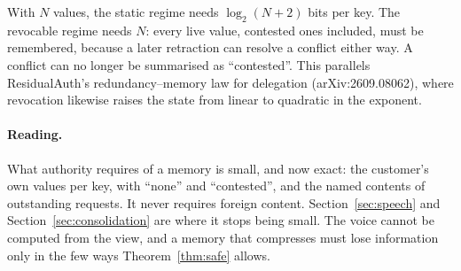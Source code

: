\begin{corollary}\label{cor:rev-size}
With $N$ values, the static regime needs $\log_2 (N + 2)$ bits per key. The revocable regime needs
$N$: every live value, contested ones included, must be remembered, because a later retraction
can resolve a conflict either way. A conflict can no longer be summarised as ``contested''. This
parallels ResidualAuth's redundancy--memory law for delegation (arXiv:2609.08062), where
revocation likewise raises the state from linear to quadratic in the exponent.
\end{corollary}

\paragraph{Reading.} What authority requires of a memory is small, and now exact: the customer's
own values per key, with ``none'' and ``contested'', and the named contents of outstanding
requests. It never requires foreign content. Section~\ref{sec:speech} and
Section~\ref{sec:consolidation} are where it stops being small. The voice cannot be computed from
the view, and a memory that compresses must lose information only in the few ways
Theorem~\ref{thm:safe} allows.
